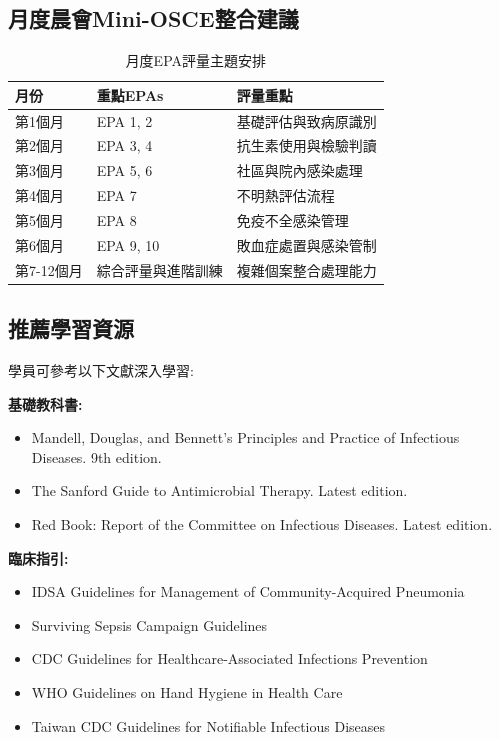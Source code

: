 \documentclass[12pt,a4paper]{article}
\begin{document}
\subsection{月度晨會Mini-OSCE整合建議}
\begin{table}[h]
    \centering
    \caption{月度EPA評量主題安排}
    \begin{tabular}{p{2.5cm} p{4.5cm} p{7cm}}
        \toprule
        \textbf{月份} & \textbf{重點EPAs} & \textbf{評量重點} \\
        \midrule
        第1個月 & EPA 1, 2 & 基礎評估與致病原識別 \\
        第2個月 & EPA 3, 4 & 抗生素使用與檢驗判讀 \\
        第3個月 & EPA 5, 6 & 社區與院內感染處理 \\
        第4個月 & EPA 7 & 不明熱評估流程 \\
        第5個月 & EPA 8 & 免疫不全感染管理 \\
        第6個月 & EPA 9, 10 & 敗血症處置與感染管制 \\
        第7-12個月 & 綜合評量與進階訓練 & 複雜個案整合處理能力 \\
        \bottomrule
    \end{tabular}
\end{table}

\subsection{推薦學習資源}
學員可參考以下文獻深入學習:

\textbf{基礎教科書:}
\begin{itemize}
    \item Mandell, Douglas, and Bennett's Principles and Practice of Infectious Diseases. 9th edition.
    \item The Sanford Guide to Antimicrobial Therapy. Latest edition.
    \item Red Book: Report of the Committee on Infectious Diseases. Latest edition.
\end{itemize}

\textbf{臨床指引:}
\begin{itemize}
    \item IDSA Guidelines for Management of Community-Acquired Pneumonia
    \item Surviving Sepsis Campaign Guidelines
    \item CDC Guidelines for Healthcare-Associated Infections Prevention
    \item WHO Guidelines on Hand Hygiene in Health Care
    \item Taiwan CDC Guidelines for Notifiable Infectious Diseases
\end{itemize}
\end{document}
